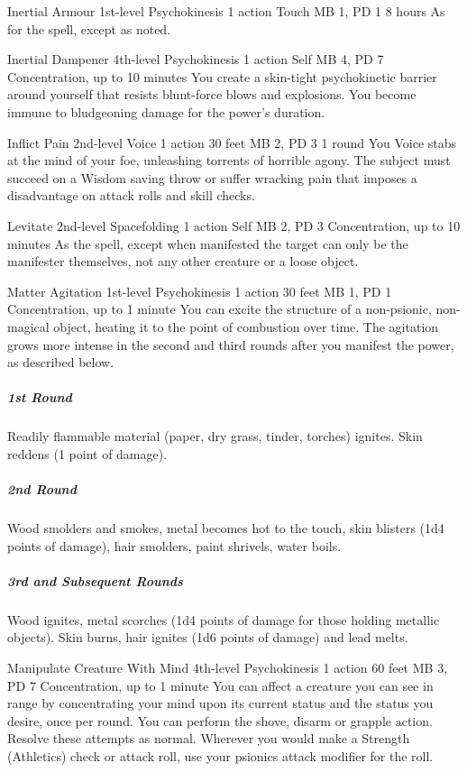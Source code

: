 \DndPowerHeader%
  {Inertial Armour}
  {1st-level Psychokinesis}
  {1 action}
  {Touch}
  {MB 1, PD 1}
  {8 hours}
As for the  spell, except as noted.

\DndPowerHeader%
  {Inertial Dampener}
  {4th-level Psychokinesis}
  {1 action}
  {Self}
  {MB 4, PD 7}
  {Concentration, up to 10 minutes}
  You create a skin-tight psychokinetic barrier around yourself
  that resists blunt-force blows and explosions.
  You become immune to bludgeoning damage for the power's duration.

\DndPowerHeader%
  {Inflict Pain}
  {2nd-level Voice}
  {1 action}
  {30 feet}
  {MB 2, PD 3}
  {1 round}
  You Voice stabs at the mind of your foe,
  unleashing torrents of horrible agony.
  The subject must succeed on a Wisdom saving throw or
  suffer wracking pain that imposes a disadvantage on attack rolls
  and skill checks.

\DndPowerHeader%
  {Levitate}
  {2nd-level Spacefolding}
  {1 action}
  {Self}
  {MB 2, PD 3}
  {Concentration, up to 10 minutes}
As the  spell,
except when manifested the target can only be the manifester themselves,
not any other creature or a loose object.

\DndPowerHeader%
  {Matter Agitation}
  {1st-level Psychokinesis}
  {1 action}
  {30 feet}
  {MB 1, PD 1}
  {Concentration, up to 1 minute}
  You can excite the structure of a non-psionic,
  non-magical object,
  heating it to the point of combustion over time.
  The agitation grows more intense in the second and third rounds
  after you manifest the power, as described below.

  \subparagraph{1st Round}
    Readily flammable material
    (paper, dry grass, tinder, torches) ignites.
    Skin reddens (1 point of damage).
  \subparagraph{2nd Round}
    Wood smolders and smokes,
    metal becomes hot to the touch,
    skin blisters (1d4 points of damage),
    hair smolders, paint shrivels, water boils.
  \subparagraph{3rd and Subsequent Rounds}
    Wood ignites, metal scorches
    (1d4 points of damage for those holding metallic objects).
    Skin burns, hair ignites (1d6 points of damage) and lead melts.

\DndPowerHeader%
  {Manipulate Creature With Mind}
  {4th-level Psychokinesis}
  {1 action}
  {60 feet}
  {MB 3, PD 7}
  {Concentration, up to 1 minute}
You can affect a creature you can see in range by
concentrating your mind upon its current status
and the status you desire, once per round.
You can perform the shove, disarm or grapple action.
Resolve these attempts as normal.
Wherever you would make a Strength (Athletics) check or attack roll,
use your psionics attack modifier for the roll.
  
